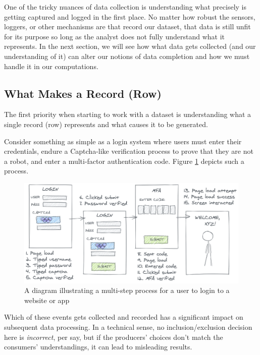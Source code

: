 \documentclass[
]{krantz}
\begin{document}
One of the tricky nuances of data collection is understanding what precisely is getting captured and logged in the first place.
No matter how robust the sensors, loggers, or other mechanisms are that record our dataset, that data is still unfit for its purpose so long as the analyst does not fully understand what it represents.
In the next section, we will see how what data gets collected (and our understanding of it) can alter our notions of data completion and how we must handle it in our computations.

\hypertarget{what-makes-a-record-row}{%
\subsection{What Makes a Record (Row)}\label{what-makes-a-record-row}}

The first priority when starting to work with a dataset is understanding what a single record (row) represents and what causes it to be generated.

Consider something as simple as a login system where users must enter their credentials, endure a Captcha-like verification process to prove that they are not a robot, and enter a multi-factor authentication code. Figure \ref{fig:login-log} depicts such a process.

\begin{figure}

{\centering \includegraphics[width=0.9\linewidth]{figures/data-dall/login-log} 

}

\caption{A diagram illustrating a multi-step process for a user to login to a website or app}\label{fig:login-log}
\end{figure}

Which of these events gets collected and recorded has a significant impact on subsequent data processing.
In a technical sense, no inclusion/exclusion decision here is \emph{incorrect}, per say, but if the producers' choices don't match the consumers' understandings, it can lead to misleading results.
\end{document}
